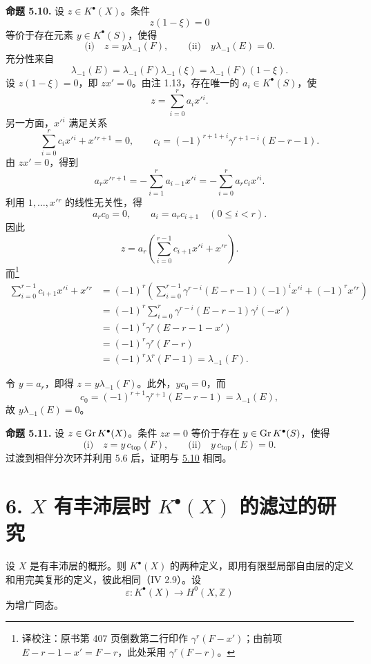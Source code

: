\textbf{命题 5.10.} 设 \(z\in K^\bullet(X)\)。条件
\[
  z(1-\xi)=0
\]
等价于存在元素 \(y\in K^\bullet(S)\)，使得
\[
  \text{(i)}\quad z=y\lambda_{-1}(F),
  \qquad
  \text{(ii)}\quad y\lambda_{-1}(E)=0.
\]
充分性来自
\[
  \lambda_{-1}(E)=\lambda_{-1}(F)\lambda_{-1}(\xi)=\lambda_{-1}(F)(1-\xi).
\]
设 \(z(1-\xi)=0\)，即 \(zx'=0\)。由注 1.13，存在唯一的 \(a_i\in K^\bullet(S)\)，使
\[
 z=\sum_{i=0}^r a_ix'{}^i.
\]
另一方面，\(x'{}^i\) 满足关系
\[
 \sum_{i=0}^r c_ix'{}^i+x'{}^{r+1}=0,
 \qquad c_i=(-1)^{r+1+i}\gamma^{r+1-i}(E-r-1).
\]
由 \(zx'=0\)，得到
\[
 a_rx'{}^{r+1}=-\sum_{i=1}^r a_{i-1}x'{}^i
             =-\sum_{i=0}^r a_rc_ix'{}^i.
\]
利用 \(1,\ldots,x'{}^r\) 的线性无关性，得
\[
 a_rc_0=0,\qquad a_i=a_rc_{i+1}\quad(0\leq i<r).
\]
因此
\[
 z=a_r\left(\sum_{i=0}^{r-1}c_{i+1}x'{}^i+x'{}^r\right).
\]
而\footnote{译校注：原书第 407 页倒数第二行印作 \(\gamma^r(F-x')\)；由前项 \(E-r-1-x'=F-r\)，此处采用 \(\gamma^r(F-r)\)。}
\[
\begin{aligned}
 \sum_{i=0}^{r-1}c_{i+1}x'{}^i+x'{}^r
 &=(-1)^r\left(\sum_{i=0}^{r-1}
       \gamma^{r-i}(E-r-1)(-1)^ix'{}^i+(-1)^rx'{}^r\right)\\
 &=(-1)^r\sum_{i=0}^r\gamma^{r-i}(E-r-1)\gamma^i(-x')\\
 &=(-1)^r\gamma^r(E-r-1-x')\\
 &=(-1)^r\gamma^r(F-r)\\
 &=(-1)^r\lambda^r(F-1)=\lambda_{-1}(F).
\end{aligned}
\]

令 \(y=a_r\)，即得 \(z=y\lambda_{-1}(F)\)。此外，\(yc_0=0\)，而
\[
 c_0=(-1)^{r+1}\gamma^{r+1}(E-r-1)=\lambda_{-1}(E),
\]
故 \(y\lambda_{-1}(E)=0\)。

\textbf{命题 5.11.} 设 \(z\in \operatorname{Gr} K^\bullet(X)\)。条件 \(zx=0\) 等价于存在 \(y\in \operatorname{Gr} K^\bullet(S)\)，使得
\[
  \text{(i)}\quad z=y\,c_{\mathrm{top}}(F),
  \qquad
  \text{(ii)}\quad y\,c_{\mathrm{top}}(E)=0.
\]
过渡到相伴分次环并利用 5.6 后，证明与 \hyperlink{sga6.e06.prop.5-10}{5.10} 相同。

\section*{6. \(X\) 有丰沛层时 \(K^\bullet(X)\) 的滤过的研究}

设 \(X\) 是有丰沛层的概形。则 \(K^\bullet(X)\) 的两种定义，即用有限型局部自由层的定义和用完美复形的定义，彼此相同（IV 2.9）。设
\[
  \varepsilon:K^\bullet(X)\longrightarrow H^0(X,\mathbb Z)
\]
为增广同态。

